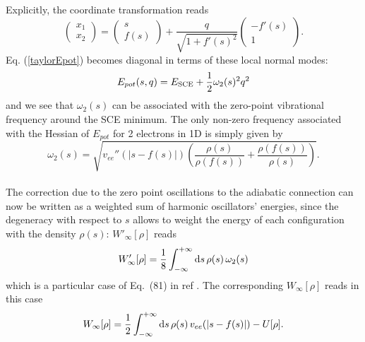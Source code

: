 \documentclass[aps,pra,twocolumn,superscriptaddress]{revtex4}
\begin{document}
Explicitly, the coordinate transformation reads
\begin{equation}\label{transformationcoordinates}
\begin{pmatrix}
x_1\\x_2
\end{pmatrix}=\begin{pmatrix}
s\\f(s)
\end{pmatrix}+\frac{q}{\sqrt{1+f'(s)^2}}\begin{pmatrix}
-f'(s)\\1
\end{pmatrix}.
\end{equation}
Eq. (\ref{taylorEpot}) becomes diagonal in terms of these local normal modes: 
\begin{equation}
E_{pot}(s,q)=E_{\rm{SCE}}+\frac{1}{2}\omega_{2}(s)^2q^2
\end{equation} and we see that $\omega_{2}(s)$ can be associated with the zero-point vibrational frequency around the SCE minimum. The only non-zero frequency associated with the Hessian of $E_{pot}$ for 2 electrons in 1D is simply given by \citep{MalMirGieWagGor-PCCP-14}
\begin{equation}\label{omega1D}
\omega_{2}(s)=\sqrt{v_{ee}''\left(\vert s-f(s)\vert\right)\left(\frac{\rho(s)}{\rho(f(s))}+\frac{\rho(f(s))}{\rho(s)}\right)}.
\end{equation}
\\The correction due to the zero point oscillations to the adiabatic connection can now be written as a weighted sum of harmonic oscillators' energies, since the degeneracy with respect to $\textit{s}$ allows to weight the energy of each configuration with the density $\rho(s)$: $W'_{\infty}[\rho]$ reads 
\begin{equation}\label{WinftySimplified}
W'_{\infty}[\rho]=\frac{1}{8}\int_{-\infty}^{+\infty} \text{\rm{d}}s\, \rho(s)\, \omega_2(s)
\end{equation} which is a particular case of Eq.~(81) in ref \citep{GorVigSei-JCTC-09}. The corresponding $W_\infty[\rho]$ reads in this case
\begin{equation}
	\label{eq:Winfty1D}
	W_\infty[\rho]=\frac{1}{2}\int_{-\infty}^{+\infty}\text{\rm{d}}s\, \rho(s)\,v_{ee}(|s-f(s)|)-U[\rho].
\end{equation}
\end{document}
